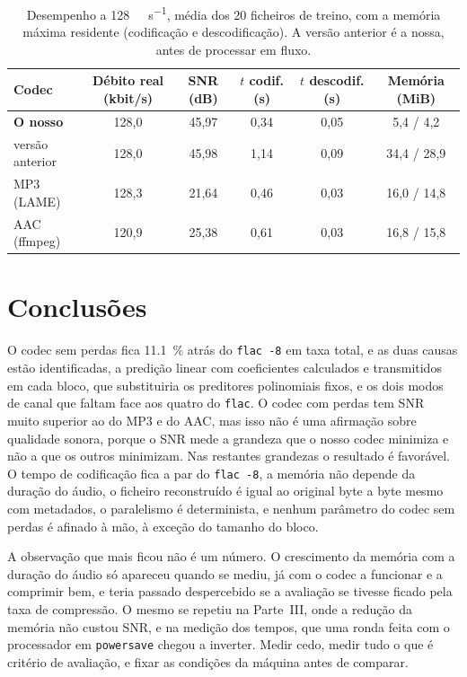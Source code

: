 \documentclass[a4paper,11pt]{article}
\newcommand{\prog}[1]{\texttt{#1}}
\begin{document}
\begin{table}[htbp]
\centering
\small
\begin{tabular}{lccccc}
\toprule
Codec & Débito real (kbit/s) & SNR (dB) & $t$ codif. (s) & $t$ descodif. (s) & Memória (MiB) \\
\midrule
\textbf{O nosso}      & 128,0 & 45,97 & 0,34 & 0,05 & 5,4 / 4,2 \\
\quad versão anterior & 128,0 & 45,98 & 1,14 & 0,09 & 34,4 / 28,9 \\
MP3 (LAME)            & 128,3 & 21,64 & 0,46 & 0,03 & 16,0 / 14,8 \\
AAC (ffmpeg)          & 120,9 & 25,38 & 0,61 & 0,03 & 16,8 / 15,8 \\
\bottomrule
\end{tabular}
\caption{Desempenho a \SI{128}{\kilo\bit\per\second}, média dos 20 ficheiros de
treino, com a memória máxima residente (codificação e descodificação). A versão
anterior é a nossa, antes de processar em fluxo.}
\label{tab:lossy-perf}
\end{table}



\section{Conclusões}
\label{sec:conclusoes}
O codec sem perdas fica \SI{11,1}{\percent} atrás do \prog{flac -8} em taxa
total, e as duas causas estão identificadas, a predição linear com coeficientes
calculados e transmitidos em cada bloco, que substituiria os preditores
polinomiais fixos, e os dois modos de canal que faltam face aos quatro do
\prog{flac}. O codec com perdas tem SNR muito superior ao do MP3 e do AAC, mas
isso não é uma afirmação sobre qualidade sonora, porque o SNR mede a grandeza
que o nosso codec minimiza e não a que os outros minimizam. Nas restantes
grandezas o resultado é favorável. O tempo de codificação fica a par do
\prog{flac -8}, a memória não depende da duração do áudio, o ficheiro
reconstruído é igual ao original byte a byte mesmo com metadados, o paralelismo
é determinista, e nenhum parâmetro do codec sem perdas é afinado à mão, à
exceção do tamanho do bloco.

A observação que mais ficou não é um número. O crescimento da memória com a
duração do áudio só apareceu quando se mediu, já com o codec a funcionar e a
comprimir bem, e teria passado despercebido se a avaliação se tivesse ficado
pela taxa de compressão. O mesmo se repetiu na Parte~III, onde a redução da
memória não custou SNR, e na medição dos tempos, que uma ronda feita com o
processador em \texttt{powersave} chegou a inverter. Medir cedo, medir tudo o
que é critério de avaliação, e fixar as condições da máquina antes de comparar.
\end{document}
